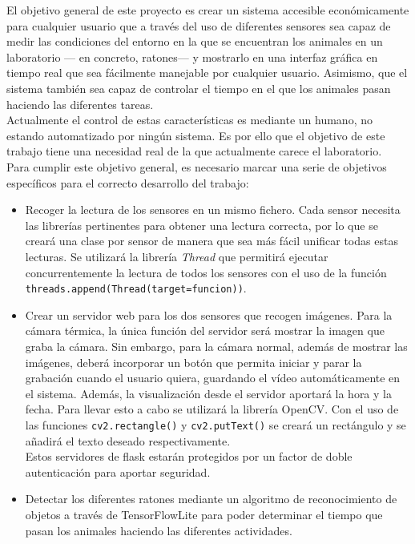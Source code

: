 El objetivo general de este proyecto es crear un sistema accesible económicamente para cualquier usuario que a través del uso de diferentes sensores sea capaz de medir las condiciones del entorno en la que se encuentran los animales en un laboratorio --- en concreto, ratones--- y mostrarlo en una interfaz gráfica en tiempo real que sea fácilmente manejable por cualquier usuario. Asimismo, que el sistema también sea capaz de controlar el tiempo en el que los animales pasan haciendo las diferentes tareas.\\
Actualmente el control de estas características es mediante un humano, no estando automatizado por ningún sistema. Es por ello que el objetivo de este trabajo tiene una necesidad real de la que actualmente carece el laboratorio.\\
Para cumplir este objetivo general, es necesario marcar una serie de objetivos específicos para el correcto desarrollo del trabajo:
\begin{itemize}
 \item Recoger la lectura de los sensores en un mismo fichero. Cada sensor necesita las librerías pertinentes para obtener una lectura correcta, por lo que se creará una clase por sensor de manera que sea más fácil unificar todas estas lecturas. Se utilizará la librería \textit{Thread} que permitirá ejecutar concurrentemente la lectura de todos los sensores con el uso de la función \verb|threads.append(Thread(target=funcion))|.
 \item Crear un servidor web para los dos sensores que recogen imágenes. Para la cámara térmica, la única función del servidor será mostrar la imagen que graba la cámara. Sin embargo, para la cámara normal, además de mostrar las imágenes, deberá incorporar un botón que permita iniciar y parar la grabación cuando el usuario quiera, guardando el vídeo automáticamente en el sistema. Además, la visualización desde el servidor aportará la hora y la fecha. Para llevar esto a cabo se utilizará la librería OpenCV. Con el uso de las funciones \verb|cv2.rectangle()| y \verb|cv2.putText()| se creará un rectángulo y se añadirá el texto deseado respectivamente.\\
 Estos servidores de flask estarán protegidos por un factor de doble autenticación para aportar seguridad.
 \item Detectar los diferentes ratones mediante un algoritmo de reconocimiento de objetos a través de TensorFlowLite para poder determinar el tiempo que pasan los animales haciendo las diferentes actividades.
\end{itemize}
